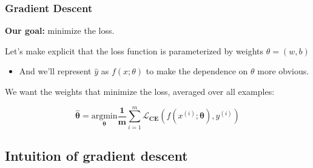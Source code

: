 \documentclass[13.5pt,aspecratio=169]{beamer}
\begin{document}
\begin{frame}
	\frametitle{Gradient Descent}
	\begin{block}{} %
		\textbf{Our goal:} minimize the loss.
	\end{block}
    
    \begin{block}{} %
        Let's make explicit that the loss function is parameterized by weights $\theta = (w,b)$
	\end{block}
    \begin{itemize}
        \item And we'll represent $\hat{y}$ as \textit{$f(x; \theta)$} to make the dependence on $\theta$ more obvious.
	\end{itemize}

    \begin{block}{} %
        We want the weights that minimize the loss, averaged over all examples:
	\end{block}
    {\fontsize{16}{20}\selectfont
    \begin{center} %
        \[ \bm{\hat{\theta}} =  \underset{\bm{\theta}}{\text{argmin}} \frac{\bm{1}}{\bm{m}} \sum_{i=1}^{m} \bm{\mathcal{L}}_{\bm{CE}}(f(x^{(i)}; \bm{\theta}), y^{(i)})\]
      \end{center}
    }

\end{frame}



\subsection{Intuition of gradient descent}
\end{document}

